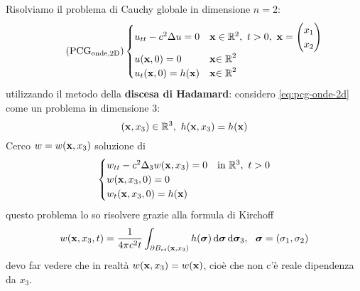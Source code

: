 Risolviamo il problema di Cauchy globale in dimensione $n=2$:
\begin{equation*}
    \tag{PCG$_{\text{onde,2D}}$}
    \begin{cases}
        u_{tt} -c^{2} \Delta u=0 & \x \in \mathbb{R}^{2} ,\ t >0,\ \x =
        \begin{pmatrix}
            x_{1} \\
            x_{2}
        \end{pmatrix}                                     \\
        u(\x ,0) =0              & \x\mathbb{\in R}^{2}                 \\
        u_{t}(\x ,0) =h(\x)      & \x\mathbb{\in R}^{2}
    \end{cases}
    \label{eq:pcg-onde-2d}
\end{equation*}
utilizzando il metodo della \textbf{discesa di Hadamard}: considero \eqref{eq:pcg-onde-2d} come un problema in dimensione $3$:
\begin{equation}
    (\mathbf{x} ,x_{3}) \in \mathbb{R}^{3} ,\ h(\mathbf{x} ,x_{3}) =h(\mathbf{x})
\end{equation}
Cerco $\displaystyle w=w(\mathbf{x} ,x_{3})$ soluzione di
\begin{equation*}
    \begin{cases}
        w_{tt} -c^{2} \Delta _{3} w(\x ,x_{3}) =0 & \text{in} \ \mathbb{R}^{3} ,\ t >0 \\
        w(\x ,x_{3} ,0) =0                        &                                    \\
        w_{t}(\x ,x_{3} ,0) =h(\x)                &
    \end{cases}
\end{equation*}
questo problema lo so risolvere grazie alla formula di Kirchoff
\begin{equation*}
    w(\mathbf{x} ,x_{3} ,t) =\frac{1}{4\pi c^{2} t}\int _{\partial B_{ct}(\mathbf{x} ,x_{3})} h(\bm{\sigma}) \,\mathrm d \bm{\sigma} \,\mathrm d \bm{\sigma} _{3} ,\ \ \bm{\sigma} =(\sigma _{1} ,\sigma _{2})
\end{equation*}
devo far vedere che in realtà $\displaystyle w(\mathbf{x} ,x_{3}) =w(\mathbf{x})$, cioè che non c'è reale dipendenza da $\displaystyle x_{3}$.

